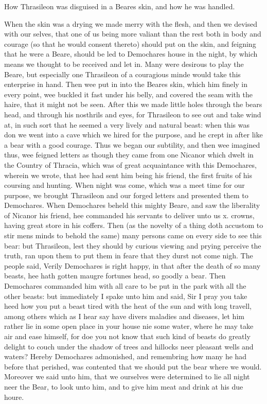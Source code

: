 
How Thrasileon was disguised in a Beares skin, and how he was handled.

When the skin was a drying we made merry with the flesh, and then we devised
with our selves, that one of us being more valiant than the rest both in body
and courage (so that he would consent thereto) should put on the skin, and
feigning that he were a Beare, should be led to Demochares house in the night,
by which means we thought to be received and let in. Many were desirous to play
the Beare, but especially one Thrasileon of a couragious minde would take this
enterprise in hand. Then wee put in into the Beares skin, which him finely in
every point, wee buckled it fast under his belly, and covered the seam with the
haire, that it might not be seen. After this we made little holes through the
bears head, and through his nosthrils and eyes, for Thrasileon to see out and
take wind at, in such sort that he seemed a very lively and natural beast: when
this was don we went into a cave which we hired for the purpose, and he crept
in after like a bear with a good courage. Thus we began our subtility, and then
wee imagined thus, wee feigned letters as though they came from one Nicanor
which dwelt in the Country of Thracia, which was of great acquaintance with
this Demochares, wherein we wrote, that hee had sent him being his friend, the
first fruits of his coursing and hunting. When night was come, which was a meet
time for our purpose, we brought Thrasileon and our forged letters and
presented them to Demochares. When Demochares beheld this mighty Beare, and saw
the liberality of Nicanor his friend, hee commanded his servants to deliver
unto us x. crowns, having great store in his coffers. Then (as the novelty of a
thing doth accustom to stir mens minds to behold the same) many persons came on
every side to see this bear: but Thrasileon, lest they should by curious
viewing and prying perceive the truth, ran upon them to put them in feare that
they durst not come nigh. The people said, Verily Demochares is right happy, in
that after the death of so many beasts, hee hath gotten maugre fortunes head,
so goodly a bear. Then Demochares commanded him with all care to be put in the
park with all the other beasts: but immediately I spake unto him and said, Sir
I pray you take heed how you put a beast tired with the heat of the sun and
with long travell, among others which as I hear say have divers maladies and
diseases, let him rather lie in some open place in your house nie some water,
where he may take air and ease himself, for doe you not know that such kind of
beasts do greatly delight to couch under the shadow of trees and hillocks neer
pleasant wells and waters? Hereby Demochares admonished, and remembring how
many he had before that perished, was contented that we should put the bear
where we would. Moreover we said unto him, that we ourselves were determined to
lie all night neer the Bear, to look unto him, and to give him meat and drink
at his due houre.

